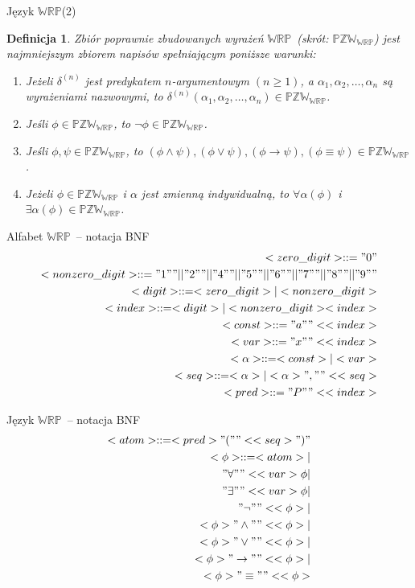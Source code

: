 \documentclass{beamer}
\newtheorem{definicja}{Definicja}
\newcommand {\PZWWRP} {\ensuremath{\mathbb{PZW_{WRP}}}}
\newcommand {\WRP} {\ensuremath{\mathbb{WRP}}}
\begin{document}
\begin{frame}{Język \WRP (2)}
%
\begin{definicja}
\label{PZWWRP}
Zbiór poprawnie zbudowanych wyrażeń \WRP~(skrót: \PZWWRP) jest najmniejszym zbiorem napisów spełniającym poniższe warunki:
%
\begin{enumerate}
\item Jeżeli $\delta^{(n)}$ jest predykatem $n$-argumentowym $(n \geq 1)$, a $\alpha_{1}, \alpha_{2}, \dots, \alpha_{n}$ są wyrażeniami nazwowymi, to $\delta^{(n)}(\alpha_{1}, \alpha_{2}, \dots, \alpha_{n}) \in \PZWWRP$.%
\item Jeśli $\phi \in \PZWWRP$, to $\neg \phi \in \PZWWRP$.
%
\item Jeśli $\phi, \psi \in \PZWWRP$, to $(\phi \land \psi), (\phi \lor \psi), (\phi \to \psi), (\phi \equiv \psi) \in \PZWWRP$.
%
\item Jeżeli $\phi \in \PZWWRP$ i $\alpha$ jest zmienną indywidualną, to $\forall \alpha (\phi)$ i $\exists \alpha (\phi) \in \PZWWRP$.
\end{enumerate}
\end{definicja}
\end{frame}

\begin{frame}{Alfabet \WRP\ -- notacja BNF}
%
\begin{eqnarray}
<zero\_digit> :: = "0" \\ %
<nonzero\_digit> :: = "1"" || "2"" || "4"" || "5"" || "6"" || "7"" || "8"" || "9"" \\ %
<digit> :: = <zero\_digit> | <nonzero\_digit> \\ %
<index> :: = <digit> | <nonzero\_digit><index> \\ %
<const> ::= "a""<<index> \\ %
<var> ::= "x""<<index> \\ %
<\alpha> ::= <const> | <var> \\ %
<seq> ::= <\alpha> | <\alpha>",""<<seq> \\ %
<pred> ::= "P"" <<index>
\end{eqnarray}
\end{frame}

\begin{frame}{Język \WRP\ -- notacja BNF}
%
\begin{eqnarray}
<atom> ::= <pred>"(""<<seq>")" \\
%
<\phi> ::= <atom> | \nonumber  \\ 
"\forall""<<var> \phi | \nonumber  \\
"\exists""<<var> \phi | \nonumber  \\
"\neg"" <<\phi> | \nonumber  \\
<\phi> "\land""<<\phi> | \nonumber \\
<\phi> "\lor""<<\phi> | \nonumber  \\
<\phi> "\to""< <\phi> | \nonumber  \\
<\phi> "\equiv""<<\phi>
\end{eqnarray}
\end{frame}
\end{document}
